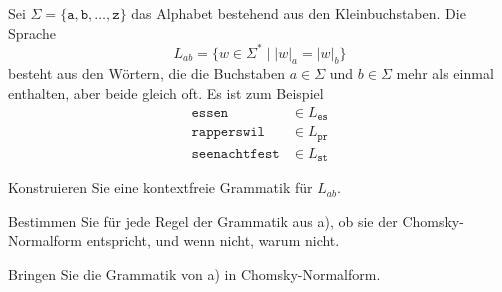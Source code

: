 Sei $\Sigma=\{\texttt{a},\texttt{b},\dots,\texttt{z}\}$ das Alphabet
bestehend aus den Kleinbuchstaben.
Die Sprache
\[
L_{ab}=\{w\in\Sigma^*\mid  |w|_a=|w|_b\}
\]
besteht aus den Wörtern, die die Buchstaben $a\in \Sigma$ und $b\in\Sigma$
mehr als einmal enthalten, aber beide gleich oft.
Es ist zum Beispiel
\begin{align*}
\texttt{essen}&\in L_{\texttt{es}}\\
\texttt{rapperswil}&\in L_{\texttt{pr}}\\
\texttt{seenachtfest}&\in L_{\texttt{st}}
\end{align*}
\begin{teilaufgaben}
\item
Konstruieren Sie eine kontextfreie Grammatik für $L_{ab}$.
\item
Bestimmen Sie für jede Regel der Grammatik aus a), ob sie der
Chomsky-Normalform entspricht, und wenn nicht, warum nicht.
\item
Bringen Sie die Grammatik von a) in Chomsky-Normalform.
\end{teilaufgaben}


